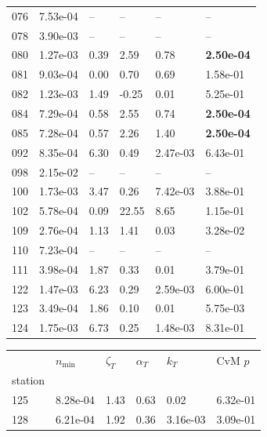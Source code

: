 \begin{figure}[htbp!]
{\begin{minipage}[t]{0.48\linewidth}
\begin{tabular}{llllll}
                    076 & 7.53e-04 & -- & -- & -- & --\\
                    078 & 3.90e-03 & -- & -- & -- & --\\
                    080 & 1.27e-03 & 0.39 & 2.59 & 0.78 & \textbf{2.50e-04}\\
                    081 & 9.03e-04 & 0.00 & 0.70 & 0.69 & 1.58e-01\\
                    082 & 1.23e-03 & 1.49 & -0.25 & 0.01 & 5.25e-01\\
                    084 & 7.29e-04 & 0.58 & 2.55 & 0.74 & \textbf{2.50e-04}\\
                    085 & 7.28e-04 & 0.57 & 2.26 & 1.40 & \textbf{2.50e-04}\\
                    092 & 8.35e-04 & 6.30 & 0.49 & 2.47e-03 & 6.43e-01\\
                    098 & 2.15e-02 & -- & -- & -- & --\\
                    100 & 1.73e-03 & 3.47 & 0.26 & 7.42e-03 & 3.88e-01\\
                    102 & 5.78e-04 & 0.09 & 22.55 & 8.65 & 1.15e-01\\
                    109 & 2.76e-04 & 1.13 & 1.41 & 0.03 & 3.28e-02\\
                    110 & 7.23e-04 & -- & -- & -- & --\\
                    111 & 3.98e-04 & 1.87 & 0.33 & 0.01 & 3.79e-01\\
                    122 & 1.47e-03 & 6.23 & 0.29 & 2.59e-03 & 6.00e-01\\
                    123 & 3.49e-04 & 1.86 & 0.10 & 0.01 & 5.75e-03\\
                    124 & 1.75e-03 & 6.73 & 0.25 & 1.48e-03 & 8.31e-01\\
        \bottomrule
        \end{tabular}
    \end{minipage}
    \hspace{0.02\linewidth}
    \begin{minipage}[t]{0.48\linewidth}
        \centering
        \begin{tabular}{llllll}
        \toprule
         & $n_{\min}$ & $\zeta_T$ & $\alpha_T$ & $k_T$ & CvM $p$ \\
        station &  &  &  &  &  \\
        \midrule
                    125 & 8.28e-04 & 1.43 & 0.63 & 0.02 & 6.32e-01\\
                    128 & 6.21e-04 & 1.92 & 0.36 & 3.16e-03 & 3.09e-01\\

\end{tabular}
\end{minipage}}
\end{figure}
